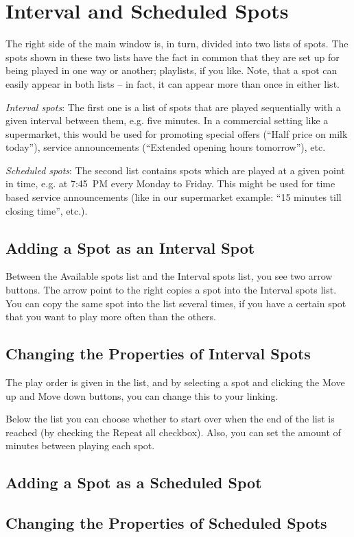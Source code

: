\documentclass[a4paper,12pt]{report}
\begin{document}
\section{Interval and Scheduled Spots}
The right side of the main window is, in turn, divided into two lists of spots. The spots shown in these two lists have the fact in common that they are set up for being played in one way or another; playlists, if you like. Note, that a spot can easily appear in both lists -- in fact, it can appear more than once in either list.

{\em Interval spots}: The first one is a list of spots that are played sequentially with a given interval between them, e.g. five minutes. In a commercial setting like a supermarket, this would be used for promoting special offers (``Half price on milk today''), service announcements (``Extended opening hours tomorrow''), etc.

{\em Scheduled spots}: The second list contains spots which are played at a given point in time, e.g. at 7:45~PM every Monday to Friday. This might be used for time based service announcements (like in our supermarket example: ``15 minutes till closing time'', etc.).

\subsection{Adding a Spot as an Interval Spot}
Between the Available spots list and the Interval spots list, you see two arrow buttons. The arrow point to the right copies a spot into the Interval spots list. You can copy the same spot into the list several times, if you have a certain spot that you want to play more often than the others.

\subsection{Changing the Properties of Interval Spots}
The play order is given in the list, and by selecting a spot and clicking the Move up and Move down buttons, you can change this to your linking.

Below the list you can choose whether to start over when the end of the list is reached (by checking the Repeat all checkbox). Also, you can set the amount of minutes between playing each spot.

\subsection{Adding a Spot as a Scheduled Spot}

\subsection{Changing the Properties of Scheduled Spots}
\end{document}
